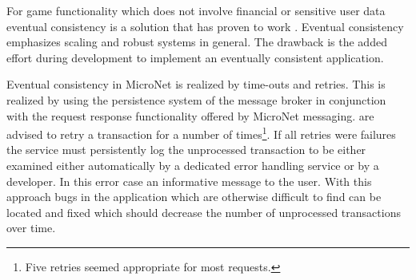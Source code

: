 For game functionality which does not involve financial or sensitive user data
eventual consistency is a solution that has proven to work
\cite{graham2016distributed_transactions}. Eventual consistency emphasizes
scaling and robust systems in general. The drawback is the added effort during
development to implement an eventually consistent application.

Eventual consistency in MicroNet is realized by time-outs and retries. This is
realized by using the persistence system of the message broker in conjunction
with the request response functionality offered by MicroNet messaging. \mss{}
are advised to retry a transaction for a number of times\footnote{Five retries
seemed appropriate for most requests.}. If all retries were failures the service
must persistently log the unprocessed transaction to be either examined either
automatically by a dedicated error handling service or by a developer. In this
error case an informative message to the user. With this approach bugs in the
application which are otherwise difficult to find can be located and fixed which
should decrease the number of unprocessed transactions over time.
